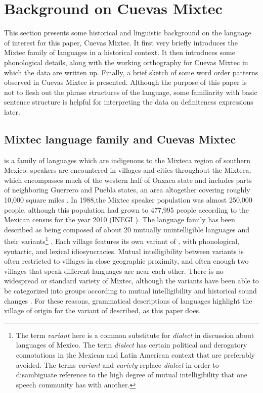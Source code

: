 \documentclass[output=paper,modfonts,nonflat]{langsci/langscibook}
\begin{document}
\section{Background on Cuevas Mixtec} \label{sec:cisneros:3}

This section presents some historical and linguistic background on the language of interest for this paper, Cuevas Mixtec.  It first very briefly introduces the Mixtec family of languages in a historical context.  It then introduces some phonological details, along with the working orthography for Cuevas Mixtec in which the data are written up.  Finally, a brief sketch of some word order patterns observed in Cuevas Mixtec is presented.  Although the purpose of this paper is not to flesh out the phrase structures of the language, some familiarity with basic sentence structure is helpful for interpreting the data on definiteness expressions later.

\subsection{Mixtec language family and Cuevas Mixtec} \label{sec:cisneros:3.1}

 is a family of languages which are indigenous to the Mixteca region of southern Mexico.   speakers are encountered in villages and cities throughout the Mixteca, which encompasses much of the western half of Oaxaca state and includes parts of neighboring Guerrero and Puebla states, an area altogether covering roughly 10,000 square miles \citep{Bradley1988}.  In 1988,\linebreak the Mixtec speaker population was almost 250,000 people, although this population had grown to 477,995 people according to the Mexican census for the year 2010 (INEGI \citeyear{inegi2010}).  The language family has been described as being composed of about 20 mutually unintelligible languages and their variants\footnote{The term \emph{variant} here is a common substitute for \emph{dialect} in discussion about languages of Mexico. The term \emph{dialect} has certain political and derogatory connotations in the Mexican and Latin American context that are preferably avoided.  The terms \emph{variant} and \emph{variety} replace \emph{dialect} in order to disambiguate reference to the high degree of mutual intelligibility that one speech community has with another.} \citep{Bradley1988}.  Each village features its own variant of , with phonological, syntactic, and lexical idiosyncracies.  Mutual intelligibility between variants is often restricted to villages in close geographic proximity, and often enough two villages that speak different  languages are near each other.  There is no widespread or standard variety of Mixtec, although the variants have been able to be categorized into groups according to mutual intelligibility \citep[25--37]{Egland1978} and historical sound changes \citep{Josserand1983}.  For these reasons, grammatical descriptions of  languages highlight the village of origin for the variant of  described, as this paper does.
\end{document}
